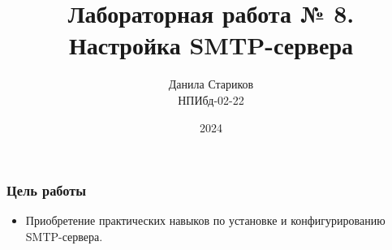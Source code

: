 

\title{Лабораторная работа № 8. \\ Настройка SMTP-сервера}
\author{Данила Стариков \\ НПИбд-02-22}
\date{2024}



\frame{\titlepage}

\begin{frame}
\frametitle{Цель работы}
\begin{itemize}
    \item Приобретение практических навыков по установке и конфигурированию SMTP-сервера.
\end{itemize}
\end{frame}


